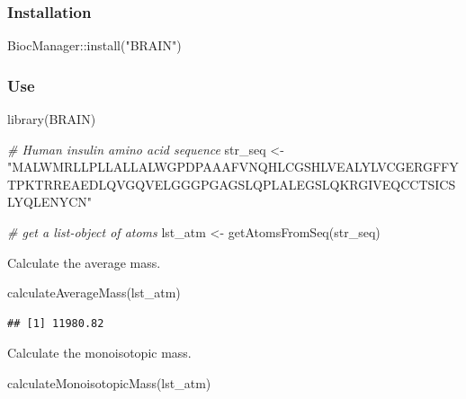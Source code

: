 \documentclass[
]{book}
\newenvironment{Shaded}{\begin{snugshade}}{\end{snugshade}}
\newcommand{\CommentTok}[1]{\textcolor[rgb]{0.56,0.35,0.01}{\textit{#1}}}
\newcommand{\FunctionTok}[1]{\textcolor[rgb]{0.00,0.00,0.00}{#1}}
\newcommand{\NormalTok}[1]{#1}
\newcommand{\OtherTok}[1]{\textcolor[rgb]{0.56,0.35,0.01}{#1}}
\newcommand{\SpecialCharTok}[1]{\textcolor[rgb]{0.00,0.00,0.00}{#1}}
\newcommand{\StringTok}[1]{\textcolor[rgb]{0.31,0.60,0.02}{#1}}
\begin{document}
\hypertarget{installation-1}{%
\subsubsection*{Installation}\label{installation-1}}

\begin{Shaded}
\begin{Highlighting}[]
\NormalTok{BiocManager}\SpecialCharTok{::}\FunctionTok{install}\NormalTok{(}\StringTok{"BRAIN"}\NormalTok{)}
\end{Highlighting}
\end{Shaded}

\hypertarget{use}{%
\subsubsection*{Use}\label{use}}

\begin{Shaded}
\begin{Highlighting}[]
\FunctionTok{library}\NormalTok{(BRAIN)}

\CommentTok{\# Human insulin amino acid sequence}
\NormalTok{str\_seq }\OtherTok{\textless{}{-}} \StringTok{"MALWMRLLPLLALLALWGPDPAAAFVNQHLCGSHLVEALYLVCGERGFFYTPKTRREAEDLQVGQVELGGGPGAGSLQPLALEGSLQKRGIVEQCCTSICSLYQLENYCN"}

\CommentTok{\# get a list{-}object of atoms}
\NormalTok{lst\_atm }\OtherTok{\textless{}{-}} \FunctionTok{getAtomsFromSeq}\NormalTok{(str\_seq) }
\end{Highlighting}
\end{Shaded}

Calculate the average mass.

\begin{Shaded}
\begin{Highlighting}[]
\FunctionTok{calculateAverageMass}\NormalTok{(lst\_atm)}
\end{Highlighting}
\end{Shaded}

\begin{verbatim}
## [1] 11980.82
\end{verbatim}

Calculate the monoisotopic mass.

\begin{Shaded}
\begin{Highlighting}[]
\FunctionTok{calculateMonoisotopicMass}\NormalTok{(lst\_atm)}
\end{Highlighting}
\end{Shaded}
\end{document}
